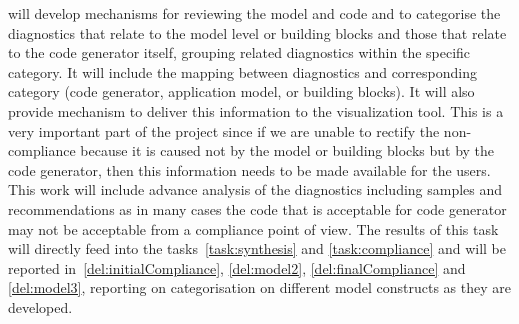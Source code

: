 \begin{Workpackage}{\thewpno}
\begin{Task}
\TaskResults{
\ref{del:initialCompliance}
\ref{del:model2}
\ref{del:finalCompliance}
\ref{del:model3}
}
\TaskHeader{}
\theTask{} will develop mechanisms for reviewing the model and code and to categorise the diagnostics that relate to the model level or building blocks and those that relate to the code generator itself, grouping related diagnostics within the specific category. It will include the mapping between diagnostics and corresponding category (code generator, application model, or building blocks). It will also provide mechanism to deliver this information to the visualization tool. This is a very important part of the project since if we are unable to rectify the non-compliance because it is caused not by the model or building blocks but by the code generator, then this information needs to be made available for the users. This work will include advance analysis of the diagnostics including samples and recommendations as in many cases the code that is acceptable for code generator may not be acceptable from a compliance point of view. The results of this task will directly feed into the tasks~\ref{task:synthesis} and \ref{task:compliance} and will be reported in~\ref{del:initialCompliance}, \ref{del:model2}, \ref{del:finalCompliance} and \ref{del:model3}, reporting on categorisation on different model constructs as they are developed. 
\end{Task}


\end{Workpackage}
